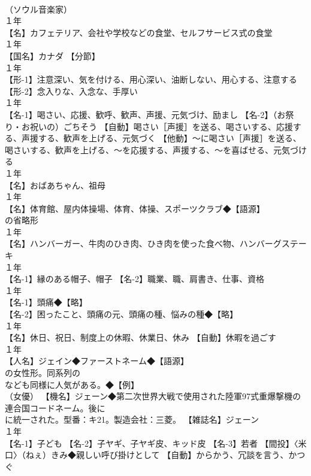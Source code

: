 \documentclass[8pt]{extreport}
\begin{document}
\begin{CJK}{UTF8}{min}
\\	（ソウル音楽家）
\\	１年	
\\	【名】カフェテリア、会社や学校などの食堂、セルフサービス式の食堂
\\	１年	
\\	【国名】カナダ 【分節】
\\	１年	
\\	【形-1】注意深い、気を付ける、用心深い、油断しない、用心する、注意する 【形-2】念入りな、入念な、手厚い
\\	１年	
\\	【名-1】喝さい、応援、歓呼、歓声、声援、元気づけ、励まし 【名-2】（お祭り・お祝いの）ごちそう 【自動】喝さい［声援］を送る、喝さいする、応援する、声援する、歓声を上げる、元気づく 【他動】～に喝さい［声援］を送る、喝さいする、歓声を上げる、～を応援する、声援する、～を喜ばせる、元気づける
\\	１年	
\\	【名】おばあちゃん、祖母
\\	１年	
\\	【名】体育館、屋内体操場、体育、体操、スポーツクラブ◆【語源】
\\	の省略形
\\	１年	
\\	【名】ハンバーガー、牛肉のひき肉、ひき肉を使った食べ物、ハンバーグステーキ
\\	１年	
\\	【名-1】縁のある帽子、帽子 【名-2】職業、職、肩書き、仕事、資格
\\	１年	
\\	【名-1】頭痛◆【略】
\\	【名-2】困ったこと、頭痛の元、頭痛の種、悩みの種◆【略】
\\	１年	
\\	【名】休日、祝日、制度上の休暇、休業日、休み 【自動】休暇を過ごす
\\	１年	
\\	【人名】ジェイン◆ファーストネーム◆【語源】
\\	の女性形。同系列の 
\\	なども同様に人気がある。◆【例】
\\	（女優） 【機名】ジェーン◆第二次世界大戦で使用された陸軍97式重爆撃機の連合国コードネーム。後に 
\\	に統一された。型番：キ21。製造会社：三菱。 【雑誌名】ジェーン
\\	１年	
\\	【名-1】子ども 【名-2】子ヤギ、子ヤギ皮、キッド皮 【名-3】若者 【間投】〈米口〉（ねぇ）きみ◆親しい呼び掛けとして 【自動】からかう、冗談を言う、かつぐ

\end{CJK}
\end{document}
